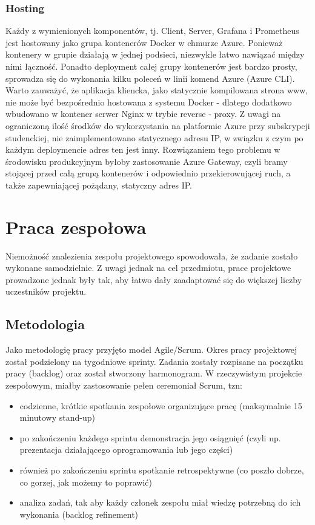 \documentclass[10pt,a4paper]{scrartcl}
\begin{document}
		\subsubsection{Hosting}
		Każdy z wymienionych komponentów, tj. Client, Server, Grafana i Prometheus jest hostowany jako grupa kontenerów Docker w chmurze Azure. Ponieważ kontenery w grupie działają w jednej podsieci, niezwykle łatwo nawiązać między nimi łączność. Ponadto deployment całej grupy kontenerów jest bardzo prosty, sprowadza się do wykonania kilku poleceń w linii komend Azure (Azure CLI). Warto zauważyć, że aplikacja kliencka, jako statycznie kompilowana strona www, nie może być bezpośrednio hostowana z systemu Docker - dlatego dodatkowo wbudowano w kontener serwer Nginx w trybie reverse - proxy. Z uwagi na ograniczoną ilość środków do wykorzystania na platformie Azure przy subskrypcji studenckiej, nie zaimplementowano statycznego adresu IP, w związku z czym po każdym deploymencie adres ten jest inny. Rozwiązaniem tego problemu w środowisku produkcyjnym byłoby zastosowanie Azure Gateway, czyli bramy stojącej przed całą grupą kontenerów i odpowiednio przekierowującej ruch, a także zapewniającej pożądany, statyczny adres IP.
		
		\section{Praca zespołowa}
		Niemożność znalezienia zespołu projektowego spowodowała, że zadanie zostało wykonane samodzielnie. Z uwagi jednak na cel przedmiotu, prace projektowe prowadzone jednak były tak, aby łatwo dały zaadaptować się do większej liczby uczestników projektu.
		
		\subsection{Metodologia}
		Jako metodologię pracy przyjęto model Agile/Scrum. Okres pracy projektowej został podzielony na tygodniowe sprinty. Zadania zostały rozpisane na początku pracy (backlog) oraz został stworzony harmonogram. 
		W rzeczywistym projekcie zespołowym, miałby zastosowanie pełen ceremoniał Scrum, tzn:
		\begin{itemize}
			\item codzienne, krótkie spotkania zespołowe organizujące pracę (maksymalnie 15 minutowy stand-up)
			\item po zakończeniu każdego sprintu demonstracja jego osiągnięć (czyli np. prezentacja działającego oprogramowania lub jego części)
			\item również po zakończeniu sprintu spotkanie retrospektywne (co poszło dobrze, co gorzej, jak możemy to poprawić)
			\item analiza zadań, tak aby każdy członek zespołu miał wiedzę potrzebną do ich wykonania (backlog refinement)
		\end{itemize}
		
\end{document}
